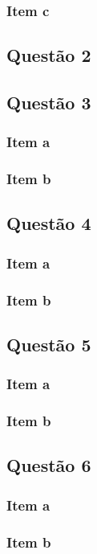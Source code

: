 \documentclass[a4paper, 12pt]{article}
\begin{document}
			\subsubsection{Item c}						
		\subsection{Questão 2}    
		\subsection{Questão 3} 
			\subsubsection{Item a}
			\subsubsection{Item b}			   
		\subsection{Questão 4}    
			\subsubsection{Item a}
			\subsubsection{Item b}			   		
		\subsection{Questão 5}    
			\subsubsection{Item a}
			\subsubsection{Item b}			   		
		\subsection{Questão 6}    				
			\subsubsection{Item a}
			\subsubsection{Item b}			   								
\end{document}
